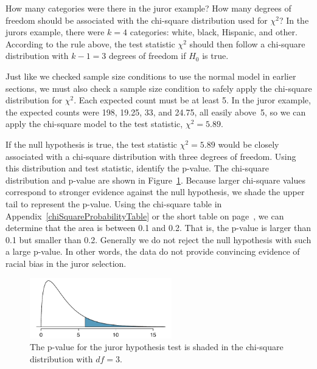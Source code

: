 \begin{example}{How many categories were there in the juror example? How many degrees of freedom should be associated with the chi-square distribution used for $\chi^2$?}
In the jurors example, there were $k=4$ categories: white, black, Hispanic, and other. According to the rule above, the test statistic $\chi^2$ should then follow a chi-square distribution with $k-1 = 3$ degrees of freedom if $H_0$ is true.
\end{example}

Just like we checked sample size conditions to use the normal model in earlier sections, we must also check a sample size condition to safely apply the chi-square distribution for $\chi^2$. Each expected count must be at least 5. In the juror example, the expected counts were 198, 19.25, 33, and 24.75, all easily above~5, so we can apply the chi-square model to the test statistic, $\chi^2=5.89$.

\begin{example}{If the null hypothesis is true, the test statistic $\chi^2=5.89$ would be closely associated with a chi-square distribution with three degrees of freedom. Using this distribution and test statistic, identify the p-value.}
The chi-square distribution and p-value are shown in Figure~\ref{jurorHTPValueShown}. Because larger chi-square values correspond to stronger evidence against the null hypothesis, we shade the upper tail to represent the p-value. Using the chi-square table in Appendix~\ref{chiSquareProbabilityTable} or the short table on page~\pageref{chiSquareProbabilityTableShort}, we can determine that the area is between 0.1 and 0.2. That is, the p-value is larger than 0.1 but smaller than 0.2. Generally we do not reject the null hypothesis with such a large p-value. In other words, the data do not provide convincing evidence of racial bias in the juror selection.
\end{example}

\begin{figure}[h]
\centering
\includegraphics[width=0.55\textwidth]{ch_inference_for_props/figures/jurorHTPValueShown/jurorHTPValueShown}
\caption{The p-value for the juror hypothesis test is shaded in the chi-square distribution with $df=3$.}
\label{jurorHTPValueShown}
\end{figure}


